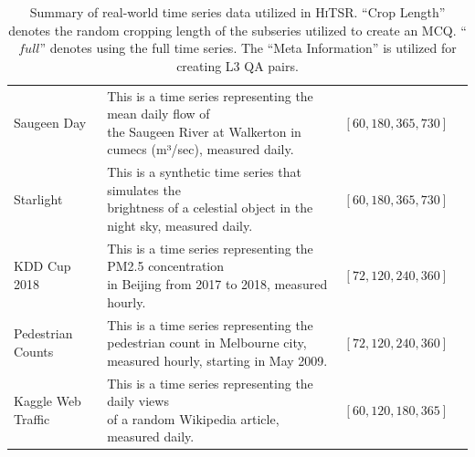 \documentclass[11pt]{article}
\begin{document}
\begin{table}[tbp]
{\begin{tabular}{l|l|c|c}
Saugeen Day & \makecell{This is a time series representing the mean daily flow of \\ the Saugeen River at Walkerton in cumecs (m³/sec), measured daily.} & $[60, 180, 365, 730]$ \\
Starlight & \makecell{This is a synthetic time series that simulates the \\ brightness of a celestial object in the night sky, measured daily.} & $[60, 180, 365, 730]$ \\
KDD Cup 2018 & \makecell{This is a time series representing the PM2.5 concentration \\ in Beijing from 2017 to 2018, measured hourly.} & $[72, 120, 240, 360]$ \\
Pedestrian Counts & \makecell{This is a time series representing the pedestrian count in Melbourne city, \\ measured hourly, starting in May 2009.} & $[72, 120, 240, 360]$ \\
Kaggle Web Traffic & \makecell{This is a time series representing the daily views \\ of a random Wikipedia article, measured daily.} & $[60, 120, 180, 365]$ \\
\bottomrule
\end{tabular}
}
\caption{Summary of real-world time series data utilized in \textsc{HiTSR}. ``Crop Length'' denotes the random cropping length of the subseries utilized to create an MCQ. ``$full$'' denotes using the full time series. The ``Meta Information'' is utilized for creating L3 QA pairs.}
\label{tab:datasum}
\end{table}
\end{document}
